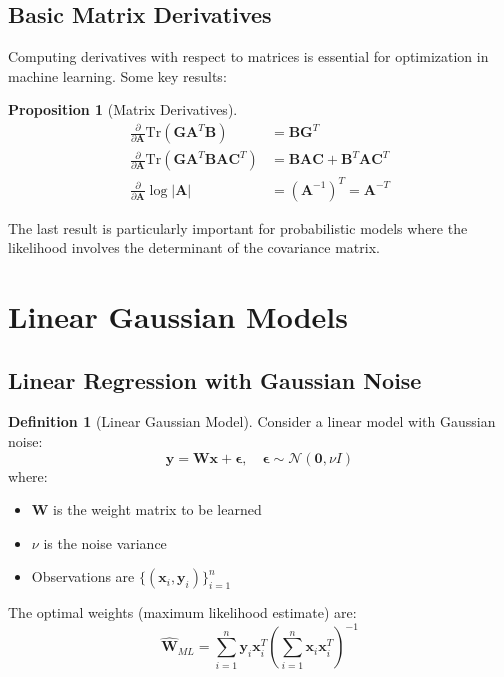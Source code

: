 \documentclass[12pt,a4paper]{article}
\theoremstyle{definition}
\newtheorem{definition}{Definition}[section]
\newtheorem{proposition}{Proposition}[section]
\begin{document}
\subsection{Basic Matrix Derivatives}

Computing derivatives with respect to matrices is essential for optimization in machine learning. Some key results:

\begin{proposition}[Matrix Derivatives]
\begin{align}
\frac{\partial}{\partial \mathbf{A}} \text{Tr}(\mathbf{G} \mathbf{A}^T \mathbf{B}) &= \mathbf{B} \mathbf{G}^T \\
\frac{\partial}{\partial \mathbf{A}} \text{Tr}(\mathbf{G} \mathbf{A}^T \mathbf{B} \mathbf{A} \mathbf{C}^T) &= \mathbf{B} \mathbf{A} \mathbf{C} + \mathbf{B}^T \mathbf{A} \mathbf{C}^T \\
\frac{\partial}{\partial \mathbf{A}} \log |\mathbf{A}| &= (\mathbf{A}^{-1})^T = \mathbf{A}^{-T}
\end{align}
\end{proposition}

The last result is particularly important for probabilistic models where the likelihood involves the determinant of the covariance matrix.

\section{Linear Gaussian Models}

\subsection{Linear Regression with Gaussian Noise}

\begin{definition}[Linear Gaussian Model]
Consider a linear model with Gaussian noise:
\[
\mathbf{y} = \mathbf{W} \mathbf{x} + \boldsymbol{\epsilon}, \quad \boldsymbol{\epsilon} \sim \mathcal{N}(\mathbf{0}, \nu I)
\]
where:
\begin{itemize}
    \item $\mathbf{W}$ is the weight matrix to be learned
    \item $\nu$ is the noise variance
    \item Observations are $\{(\mathbf{x}_i, \mathbf{y}_i)\}_{i=1}^n$
\end{itemize}

The optimal weights (maximum likelihood estimate) are:
\[
\hat{\mathbf{W}}_{ML} = \sum_{i=1}^n \mathbf{y}_i \mathbf{x}_i^T \left(\sum_{i=1}^n \mathbf{x}_i \mathbf{x}_i^T\right)^{-1}
\]
\end{definition}
\end{document}
